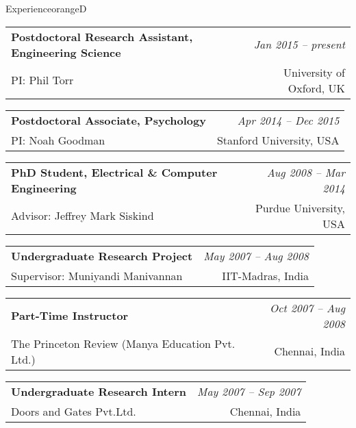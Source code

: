 \documentclass[a4paper]{article}
\makeatletter
\newlength{\itemtextwidth}
\newenvironment{position}[4]
{ \item
  \begin{tabular*}{\itemtextwidth}{@{}l@{\extracolsep{\fill}}r@{}}
    \textbf{#1} & \textit{#2} \\ #3 & \small{#4} \\
  \end{tabular*}
  \vspace*{-2pt}
} {}
\def\item{\addtocounter{enumi}{-2}\oldItem}
\makeatother
\begin{document}
\begin{region}{Experience}{orangeD}
  \begin{position} {Postdoctoral Research Assistant, Engineering Science}
    {Jan 2015 -- present}
    {PI: Phil Torr}
    {University of Oxford, UK}
  \end{position}
  \begin{position} {Postdoctoral Associate, Psychology}
    {Apr 2014 -- Dec 2015}
    {PI: Noah Goodman}
    {Stanford University, USA}
  \end{position}
  \begin{position} {PhD Student, Electrical \& Computer Engineering}
    {Aug 2008 -- Mar 2014}
    {Advisor: Jeffrey Mark Siskind}
    {Purdue University, USA}
  \end{position}
  \begin{position} {Undergraduate Research Project}
    {May 2007 -- Aug 2008}
    {Supervisor: Muniyandi Manivannan}
    {IIT-Madras, India}
  \end{position}
  \begin{position} {Part-Time Instructor}
    {Oct 2007 -- Aug 2008}
    {The Princeton Review (Manya Education Pvt. Ltd.)}
    {Chennai, India}
  \end{position}
  \begin{position} {Undergraduate Research Intern}
    {May 2007 -- Sep 2007}
    {Doors and Gates Pvt.Ltd.}
    {Chennai, India}
  \end{position}
\end{region}

\end{document}
